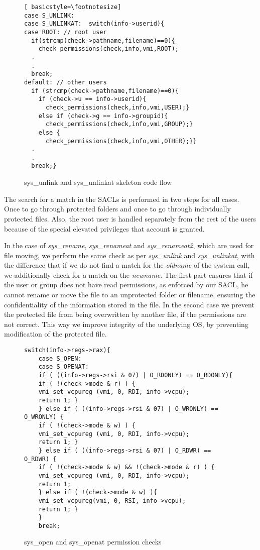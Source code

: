 \begin{figure}[ht]
\centering
\begin{lstlisting}[ basicstyle=\footnotesize]
case S_UNLINK:          
case S_UNLINKAT:  switch(info->userid){
case ROOT: // root user
  if(strcmp(check->pathname,filename)==0){
	check_permissions(check,info,vmi,ROOT);			
  .
  .
  break;
default: // other users
  if (strcmp(check->pathname,filename)==0){
	if (check->u == info->userid){
	  check_permissions(check,info,vmi,USER);}
	else if (check->g == info->groupid){
	  check_permissions(check,info,vmi,GROUP);}
	else {
	  check_permissions(check,info,vmi,OTHER);}}
  .
  .
  break;}
\end{lstlisting}
\caption{sys\_unlink and sys\_unlinkat skeleton code flow}
\label{fig:unlink}
\end{figure}

\par The search for a match in the \ac{SACL}s is performed in two steps for all cases. Once to go through protected folders and once to go through individually protected files. Also, the root user is handled separately from the rest of the users because of the special elevated privileges that account is granted. 

\par In the case of \textit{sys\_rename}, \textit{sys\_renameat} and \textit{sys\_renameat2}, which are used for file moving, we perform the same check as per \textit{sys\_unlink} and \textit{sys\_unlinkat}, with the difference that if we do not find a match for the \textit{oldname} of the system call, we additionally check for a match on the \textit{newname}. The first part ensures that if the user or group does not have read permissions, as enforced by our \ac{SACL}, he cannot rename or move the file to an unprotected folder or filename, ensuring the confidentiality of the information stored in the file. In the second case we prevent the protected file from being overwritten by another file, if the permissions are not correct. This way we improve integrity of the underlying \ac{OS}, by preventing modification of the protected file. 
\begin{figure}[ht!]
	\centering
	\begin{lstlisting}[basicstyle=\footnotesize]
	switch(info->regs->rax){
	case S_OPEN:
	case S_OPENAT:
	if ( ((info->regs->rsi & 07) | O_RDONLY) == O_RDONLY){
	if ( !(check->mode & r) ) {
	vmi_set_vcpureg (vmi, 0, RDI, info->vcpu);
	return 1; }
	} else if ( ((info->regs->rsi & 07) | O_WRONLY) == O_WRONLY) {
	if ( !(check->mode & w) ) {
	vmi_set_vcpureg (vmi, 0, RDI, info->vcpu);
	return 1; }
	} else if ( ((info->regs->rsi & 07) | O_RDWR) == O_RDWR) {
	if ( !(check->mode & w) && !(check->mode & r) ) {
	vmi_set_vcpureg (vmi, 0, RDI, info->vcpu);
	return 1;
	} else if ( !(check->mode & w) ){
	vmi_set_vcpureg(vmi, 0, RSI, info->vcpu);
	return 1; }
	}
	break;
	\end{lstlisting}
	\caption{sys\_open and sys\_openat permission checks}
	\vspace*{4in}
	\label{fig:open}
\end{figure}


